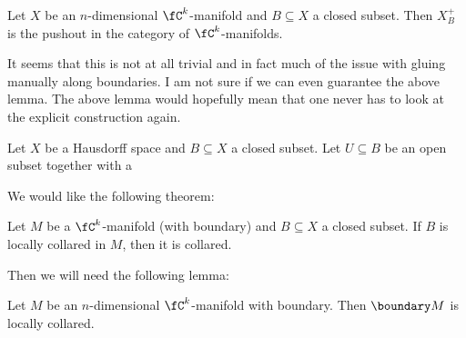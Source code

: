 \begin{lem}
    Let $X$ be an $n$-dimensional $\fC^k$-manifold and $B \subseteq X$ a closed subset. 
    Then $X^+_B$ is the pushout in the category of $\fC^k$-manifolds. 
\end{lem}

\begin{rem}
    It seems that this is not at all trivial and in fact much of the issue with gluing manually along boundaries.
    I am not sure if we can even guarantee the above lemma.
    The above lemma would hopefully mean that one never has to look at the explicit construction again.
\end{rem}


\begin{defi}
    Let $X$ be a Hausdorff space and $B \subseteq X$ a closed subset.
    Let $U \subseteq B$ be an open subset together with a 
\end{defi}

We would like the following theorem: 

\begin{thm}
    Let $M$ be a $\fC^k$-manifold (with boundary) and $B \subseteq X$ a closed subset. 
    If $B$ is locally collared in $M$, then it is collared.
\end{thm}

Then we will need the following lemma: 

\begin{lem}
    Let $M$ be an $n$-dimensional $\fC^k$-manifold with boundary. 
    Then $\boundary M$ is locally collared.
\end{lem}

